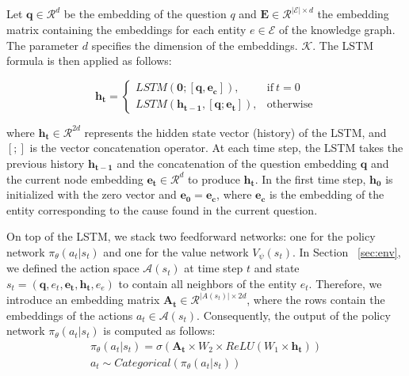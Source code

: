  Let $\mathbf{q} \in \mathcal{R}^d$ be the embedding of the question $q$ and $\mathbf{E} \in \mathcal{R}^{|\mathcal{E}| \times d}$ the 
 embedding matrix containing the embeddings for each entity $e \in \mathcal{E}$ of the knowledge graph.
 The parameter $d$ specifies the dimension of the embeddings.
  $\mathcal{K}$. The LSTM formula is then applied as follows:

\begin{equation}
	\mathbf{h_t}=
    \begin{cases}
      LSTM(\mathbf{0}; [\mathbf{q}, \mathbf{e_c}]), & \text{if}\ t=0 \\
      LSTM(\mathbf{h_{t-1}}, [\mathbf{q}; \mathbf{e_t}]), & \text{otherwise}
    \end{cases}
\end{equation}

where $\mathbf{h_t} \in \mathcal{R}^{2d}$ represents the hidden state vector (history) of the LSTM, 
and $[;]$ is the vector concatenation operator. At each time step, the LSTM takes the previous history
 $\mathbf{h_{t-1}}$ and the concatenation of the question embedding $\mathbf{q}$ and the current node embedding
 $\mathbf{e_t} \in \mathcal{R}^{d}$ to produce $\mathbf{h_t}$. In the first time step, $\mathbf{h_0}$ is initialized with the
 zero vector and $\mathbf{e_0} = \mathbf{e_c}$, where $\mathbf{e_c}$ is the embedding of the entity corresponding to 
 the cause found in the current question. 

 On top of the LSTM, we stack two feedforward networks: one for the policy 
 network $\pi_\theta(a_t | s_t)$ and one for the value network $V_\psi(s_t)$.
 In Section ~\ref{sec:env}, we defined the action space $\mathcal{A}(s_t)$ at time step $t$ and state $s_t = (\mathbf{q}, e_t, \mathbf{e_t}, \mathbf{h_t}, e_e)$
  to contain all neighbors of the entity $e_t$.
  Therefore, we introduce an embedding matrix $\mathbf{A_t} \in \mathcal{R}^{|A(s_t)| \times 2d}$, where
  the rows contain the embeddings of the actions  $a_t \in \mathcal{A}(s_t)$. Consequently, 
  the output of the policy network $\pi_{\theta}(a_t|s_t)$ is computed as follows:
\begin{equation}
	\begin{split}
	\pi_\theta(a_t | s_t) = \sigma(\mathbf{A_t} \times W_2 \times ReLU(W_1 \times \mathbf{h_t})) \\
	a_t \sim Categorical(\pi_\theta(a_t | s_t))
	\end{split}
\end{equation}


